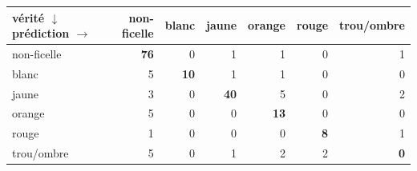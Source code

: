 \begin{tabular}{lrrrrrr}
\toprule
vérité $\downarrow$ \quad prédiction $\rightarrow$ & non-ficelle & blanc & jaune & orange & rouge & trou/ombre \\
\midrule
non-ficelle & \textbf{76} & 0 & 1 & 1 & 0 & 1 \\
blanc & 5 & \textbf{10} & 1 & 1 & 0 & 0 \\
jaune & 3 & 0 & \textbf{40} & 5 & 0 & 2 \\
orange & 5 & 0 & 0 & \textbf{13} & 0 & 0 \\
rouge & 1 & 0 & 0 & 0 & \textbf{8} & 1 \\
trou/ombre & 5 & 0 & 1 & 2 & 2 & \textbf{0} \\
\bottomrule
\end{tabular}

